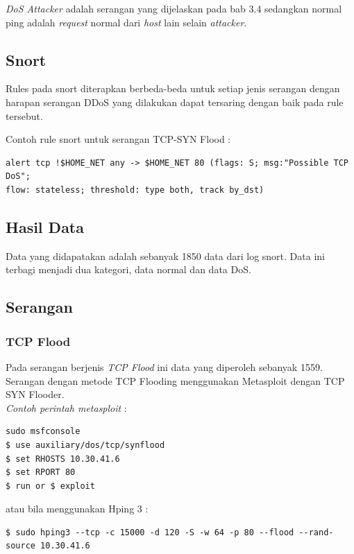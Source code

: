 \textit{DoS Attacker} adalah serangan yang dijelaskan pada bab 3.4 sedangkan normal ping adalah \textit{request} normal dari \textit{host} lain selain \textit{attacker}.



\subsection{Snort}
Rules pada snort diterapkan berbeda-beda untuk setiap jenis serangan dengan harapan serangan DDoS yang dilakukan dapat tersaring dengan baik pada rule tersebut.

Contoh rule snort untuk serangan TCP-SYN Flood : 

\begin{lstlisting}
alert tcp !$HOME_NET any -> $HOME_NET 80 (flags: S; msg:"Possible TCP DoS"; 
flow: stateless; threshold: type both, track by_dst)
\end{lstlisting}

\subsection{Hasil Data}
Data yang didapatakan adalah sebanyak 1850 data dari log snort. Data ini terbagi menjadi dua kategori, data normal dan data DoS.

\subsection{Serangan}
\subsubsection{TCP Flood}
Pada serangan berjenis \textit{TCP Flood} ini data yang diperoleh sebanyak 1559. Serangan dengan metode TCP Flooding menggunakan Metasploit dengan TCP SYN Flooder. \\

\textit{Contoh perintah metasploit} :

\begin{lstlisting}
sudo msfconsole 
$ use auxiliary/dos/tcp/synflood 
$ set RHOSTS 10.30.41.6
$ set RPORT 80
$ run or $ exploit
\end{lstlisting}

atau bila menggunakan Hping 3 :

\begin{lstlisting}
$ sudo hping3 --tcp -c 15000 -d 120 -S -w 64 -p 80 --flood --rand-source 10.30.41.6
\end{lstlisting}


